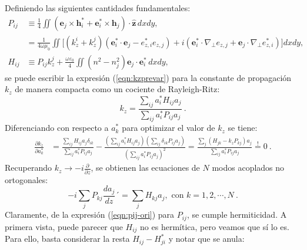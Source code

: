 Definiendo las siguientes cantidades fundamentales:
\begin{align}
	P_{ij} &\equiv \frac{1}{4} \iint \left( \textbf{e}_j \times \textbf{h}_i^* + \textbf{e}_i^* \times \textbf{h}_j \right) \cdot \hat{\textbf{z}} \, dxdy, \label{eqn:pij-ori} \\
	&= \frac{1}{4 \omega \mu_0} \iint \Big[ 
	(k_z^i + k_z^j) \left( \textbf{e}_i^* \cdot \textbf{e}_j - e_{z,i}^* e_{z,j} \right)  + i \left( \textbf{e}_i^* \cdot \nabla_\perp e_{z,j} + \textbf{e}_j \cdot \nabla_\perp e_{z,i}^* \right) \Big] dxdy, \label{eqn:pij-simpli} \\
	H_{ij} &\equiv P_{ij} k_z^j + \frac{\omega \varepsilon_0}{4} \iint (n^2-n_j^2) \textbf{e}_j \cdot \textbf{e}_i^* \, dxdy, \label{eqn:hij}
\end{align}
se puede escribir la expresión (\ref{eqn:kzprevar}) para la constante de propagación $k_z$ de manera compacta como un cociente de Rayleigh-Ritz:
\begin{equation}
	k_z = \frac{\sum_{ij} a_i^* H_{ij} a_j}{\sum_{ij} a_i^*P_{ij} a_j} \ .
\end{equation}
Diferenciando con respecto a $a_k^*$ para optimizar el valor de $k_z$ se tiene:
\begin{align}
	\frac{\partial k_z}{\partial a_k^*} &= \frac{\sum_{ij} H_{ij} a_j \delta_{ik}}{\sum_{ij} a_i^*P_{ij} a_j} - \frac{\left(\sum_{ij} a_i^* H_{ij} a_j\right) \left( 
	\sum_{ij} \delta_{ik} P_{ij} a_j \right) }{\left(\sum_{ij} a_i^*P_{ij} a_j\right)^2} = \frac{\sum_{j} \left(H_{jk}  - k_z P_{kj} \right) a_j}{\sum_{ij} a_i^* P_{ij}a_j} \overset{!}{=} 0 \ .
\end{align}
Recuperando $k_z \to -i\frac{\partial}{\partial z}$, se obtienen las ecuaciones de $N$ modos acoplados no ortogonales:
\begin{equation}
	-i \sum_{j} P_{kj} \frac{d a_j}{dz} ´= \sum_{j} H_{kj} a_j, \text{ con }k=1,2,\cdots,N \ . \label{eqn:non-ortho-CMT-eqs}
\end{equation}
Claramente, de la expresión (\ref{eqn:pij-ori}) para $P_{ij}$, se cumple hermiticidad. A primera vista, puede parecer que $H_{ij}$ no es hermítica, pero veamos que sí lo es. Para ello, basta considerar la resta $H_{ij} - H_{ji}^*$ y notar que se anula:
